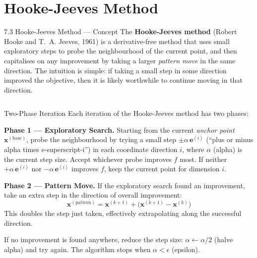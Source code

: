 \documentclass[aspectratio=169,10pt]{beamer}
\begin{document}
\section{Hooke-Jeeves Method}

\begin{frame}[allowframebreaks]{7.3 Hooke-Jeeves Method --- Concept}
  The \textbf{Hooke-Jeeves method} (Robert Hooke and T.~A. Jeeves,
  1961) is a derivative-free method that uses small exploratory steps
  to probe the neighbourhood of the current point, and then capitalises
  on any improvement by taking a larger \emph{pattern move} in the
  same direction.  The intuition is simple: if taking a small step in
  some direction improved the objective, then it is likely worthwhile
  to continue moving in that direction.

  \begin{columns}[T]
      \begin{block}{Two-Phase Iteration}
        Each iteration of the Hooke-Jeeves method has two phases:

        \textbf{Phase 1 --- Exploratory Search.}
        Starting from the current \emph{anchor point}
        $\mathbf{x}^{(\text{base})}$, probe the neighbourhood by
        trying a small step $\pm\alpha\,\mathbf{e}^{(i)}$ (``plus or
        minus alpha times e-superscript-i'') in each coordinate
        direction $i$, where $\alpha$ (alpha) is the current step size.
        Accept whichever probe improves $f$ most.  If neither
        $+\alpha\,\mathbf{e}^{(i)}$ nor $-\alpha\,\mathbf{e}^{(i)}$
        improves $f$, keep the current point for dimension $i$.

        \textbf{Phase 2 --- Pattern Move.}
        If the exploratory search found an improvement, take an extra
        step in the direction of overall improvement:
        \[
          \mathbf{x}^{(\text{pattern})} =
          \mathbf{x}^{(k+1)} + \bigl(\mathbf{x}^{(k+1)} - \mathbf{x}^{(k)}\bigr)
        \]
        This doubles the step just taken, effectively extrapolating
        along the successful direction.

        If no improvement is found anywhere, reduce the step size:
        $\alpha \leftarrow \alpha / 2$ (halve alpha) and try again.
        The algorithm stops when $\alpha < \epsilon$ (epsilon).
      \end{block}


\end{columns}
\end{frame}
\end{document}
